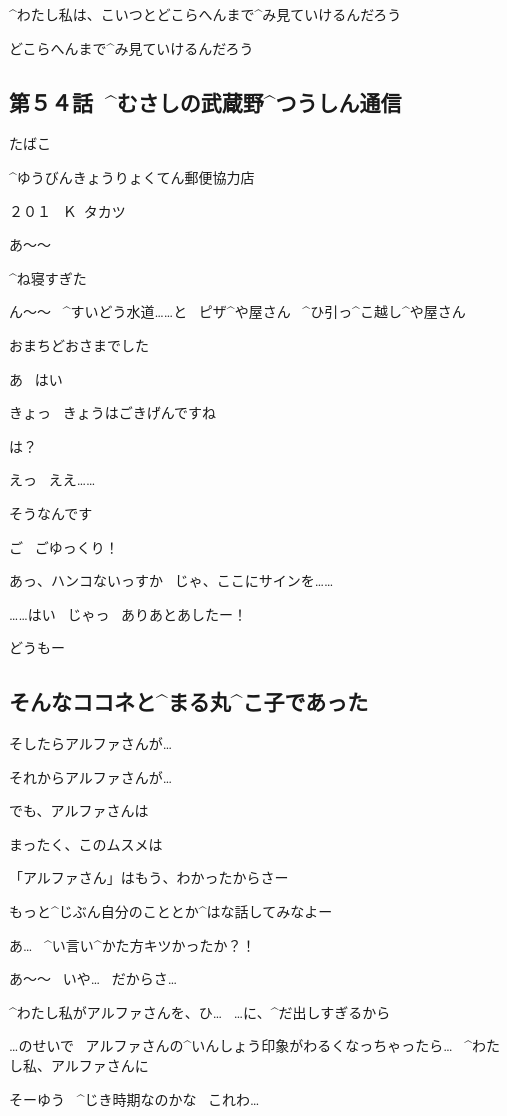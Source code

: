 \page
\Sensei ^{わたし}{私}は、こいつとどこらへんまで^{み}{見}ていけるんだろう

\page[152]
\Sensei どこらへんまで^{み}{見}ていけるんだろう


\subsection{第５４話\ ^{むさしの}{武蔵野}^{つうしん}{通信}}

\page[155]
\Sign たばこ

\Sign ^{ゆうびんきょうりょくてん}{郵便協力店}

\page
\Sign ２０１
\ Ｋ\ タカツ

\page[158]
\Kokone あ〜〜

\Kokone ^{ね}{寝}すぎた

\Kokone ん〜〜
\ ^{すいどう}{水道}……と
\ ピザ^{や}{屋}さん
\ ^{ひ}{引}っ^{こ}{越}し^{や}{屋}さん

\page[164]
\Person おまちどおさまでした

\Kokone あ
\ はい

\Person きょっ
\ きょうはごきげんですね

\Kokone は？

\Kokone えっ
\ ええ……

\page
\Kokone そうなんです

\Person ご
\ ごゆっくり！

\page[167]
\Person あっ、ハンコないっすか
\ じゃ、ここにサインを……

\Person ……はい
\ じゃっ
\ ありあとあしたー！

\Alpha どうもー


\subsection{そんなココネと^{まる}{丸}^{こ}{子}であった}

\Kokone そしたらアルファさんが…

\Kokone それからアルファさんが…

\Kokone でも、アルファさんは

\Maruko まったく、このムスメは

\Maruko 「アルファさん」はもう、わかったからさー

\Maruko もっと^{じぶん}{自分}のこととか^{はな}{話}してみなよー

\Maruko あ…
\ ^{い}{言}い^{かた}{方}キツかったか？！

\Maruko あ〜〜
\ いや…
\ だからさ…

\Kokone ^{わたし}{私}がアルファさんを、ひ…
\ …に、^{だ}{出}しすぎるから

\Kokone …のせいで
\ アルファさんの^{いんしょう}{印象}がわるくなっちゃったら…
\ ^{わたし}{私}、アルファさんに

\Maruko そーゆう
\ ^{じき}{時期}なのかな
\ これわ…
